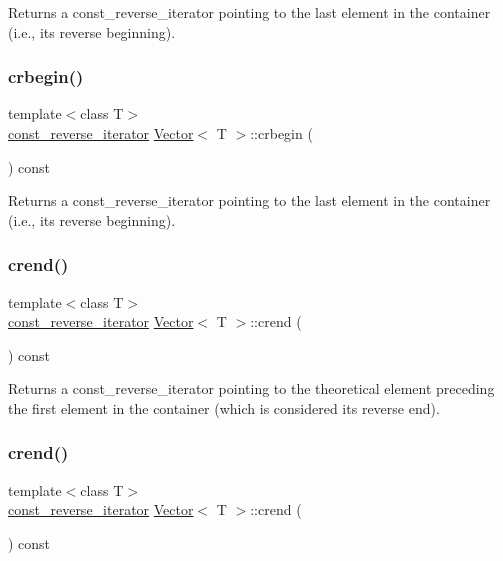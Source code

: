 Returns a const\+\_\+reverse\+\_\+iterator pointing to the last element in the container (i.\+e., its reverse beginning). \mbox{\label{classVector_af5f7e3324c56c546c88099d12820c432}} 
\subsubsection{\texorpdfstring{crbegin()}{crbegin()}\hspace{0.1cm}{\footnotesize\ttfamily [2/2]}}
{\footnotesize\ttfamily template$<$class T$>$ \\
\hyperlink{classVector_a963c193ac2399eed1cf20d74f559ef2a}{const\+\_\+reverse\+\_\+iterator} \hyperlink{classVector}{Vector}$<$ T $>$\+::crbegin (\begin{DoxyParamCaption}{ }\end{DoxyParamCaption}) const\hspace{0.3cm}{\ttfamily [inline]}}

Returns a const\+\_\+reverse\+\_\+iterator pointing to the last element in the container (i.\+e., its reverse beginning). \mbox{\label{classVector_a2b2998e97102c3750b0b556431b5b6b6}} 
\subsubsection{\texorpdfstring{crend()}{crend()}\hspace{0.1cm}{\footnotesize\ttfamily [1/2]}}
{\footnotesize\ttfamily template$<$class T$>$ \\
\hyperlink{classVector_a963c193ac2399eed1cf20d74f559ef2a}{const\+\_\+reverse\+\_\+iterator} \hyperlink{classVector}{Vector}$<$ T $>$\+::crend (\begin{DoxyParamCaption}{ }\end{DoxyParamCaption}) const\hspace{0.3cm}{\ttfamily [inline]}}

Returns a const\+\_\+reverse\+\_\+iterator pointing to the theoretical element preceding the first element in the container (which is considered its reverse end). \mbox{\label{classVector_a2b2998e97102c3750b0b556431b5b6b6}} 
\subsubsection{\texorpdfstring{crend()}{crend()}\hspace{0.1cm}{\footnotesize\ttfamily [2/2]}}
{\footnotesize\ttfamily template$<$class T$>$ \\
\hyperlink{classVector_a963c193ac2399eed1cf20d74f559ef2a}{const\+\_\+reverse\+\_\+iterator} \hyperlink{classVector}{Vector}$<$ T $>$\+::crend (\begin{DoxyParamCaption}{ }\end{DoxyParamCaption}) const\hspace{0.3cm}{\ttfamily [inline]}}

